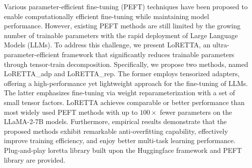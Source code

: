 Various parameter-efficient fine-tuning  (PEFT) techniques have been proposed to enable computationally efficient fine-tuning while maintaining model performance. However, existing PEFT methods are still limited by the growing number of trainable parameters with the rapid deployment of Large Language Models (LLMs). To address this challenge, we present LoRETTA, an ultra-parameter-efficient framework that significantly reduces trainable parameters through tensor-train decomposition. Specifically, we propose two methods, named LoRETTA\_adp and LoRETTA\_rep. The former employs tensorized adapters, offering a high-performance yet lightweight approach for the fine-tuning of LLMs. The latter emphasizes fine-tuning via weight reparameterization with a set of small tensor factors. LoRETTA achieves comparable or better performance than most widely used PEFT methods with up to $100\times$ fewer parameters on the LLaMA-2-7B models. Furthermore, empirical results demonstrate that the proposed methods exhibit remarkable anti-overfitting capability, effectively improve training efficiency, and enjoy better multi-task learning performance. Plug-and-play loretta library built upon the Huggingface framework and PEFT library are provided.